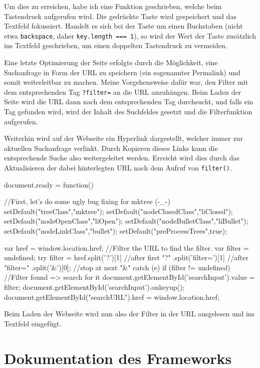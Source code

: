 \documentclass[xcolor=dvipsnames,11pt,paper=a4paper]{report}
\begin{document}
Um dies zu erreichen, habe ich eine Funktion geschrieben, welche beim Tastendruck
aufgerufen wird. Die gedrückte Taste wird gespeichert und das Textfeld fokussiert.
Handelt es sich bei der Taste um einen Buchstaben (nicht etwa \texttt{backspace},
daher \texttt{key.length === 1}), so wird der Wert der Taste zusätzlich ins Textfeld
geschrieben, um einen doppelten Tastendruck zu vermeiden.

Eine letzte Optimierung der Seite erfolgte durch die Möglichkeit, eine Suchanfrage
in Form der URL zu speichern (ein sogenannter Permalink) und somit weiterleitbar
zu machen. Meine Vorgehensweise dafür war, den Filter mit dem entsprechenden Tag
\texttt{?filter=} an die URL anzuhängen. Beim Laden der Seite wird die URL dann
nach dem entsprechenden Tag durchsucht, und falls ein Tag gefunden wird, wird der
Inhalt des Suchfeldes gesetzt und die Filterfunktion aufgerufen.

Weiterhin wird auf der Webseite ein Hyperlink dargestellt, welcher immer zur aktuellen
Suchanfrage verlinkt. Durch Kopieren dieses Links kann die entsprechende Suche also
weitergeleitet werden. Erreicht wird dies durch das Aktualisieren der dabei hinterlegten
URL nach dem Aufruf von \texttt{filter()}.

\begin{code}[language=javascript, caption={Filterung beim Laden der Seite}, label={lst:svn-ready}]
document.ready = function() {
	//First, let's do some ugly bug fixing for mktree (-_-)
	setDefault("treeClass","mktree");
	setDefault("nodeClosedClass","liClosed");
	setDefault("nodeOpenClass","liOpen");
	setDefault("nodeBulletClass","liBullet");
	setDefault("nodeLinkClass","bullet");
	setDefault("preProcessTrees",true);

	var href = window.location.href;
	//Filter the URL to find the filter.
	var filter = undefined;
	try {
		filter =	href.split('?')[1] //after first "?"
							.split('filter=')[1] //after "filter="
							.split('&')[0]; //stop at next "&"
	} catch (e) {}
	if (filter != undefined) {
		//Filter found => search for it
		document.getElementById('searchInput').value = filter;
		document.getElementById('searchInput').onkeyup();
	}
	document.getElementById("searchURL").href = window.location.href;
}
\end{code}

Beim Laden der Webseite wird nun also der Filter in der URL ausgelesen und ins Textfeld
eingefügt.



\section{Dokumentation des Frameworks}
\label{sec:ivs-dokumentation}
\end{document}
